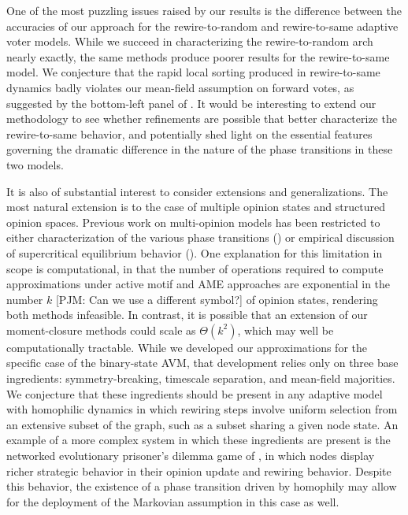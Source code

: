 \documentclass[review, onefignum, onetabnum]{siamart171218}
\newcommand{\pjm}[1]{{\color{blue}[PJM: #1]}}
\begin{document}
	One of the most puzzling issues raised by our results is the difference between the accuracies of our approach for the rewire-to-random and rewire-to-same adaptive voter models. 
	While we succeed in characterizing the rewire-to-random arch nearly exactly, the same methods produce poorer results for the rewire-to-same model. 
	We conjecture that the rapid local sorting produced in rewire-to-same dynamics badly violates our mean-field assumption on forward votes, as suggested by the bottom-left panel of . 
	It would be interesting to extend our methodology to see whether refinements are possible that better characterize the rewire-to-same behavior, and potentially shed light on the essential features governing the dramatic difference in the nature of the phase transitions in these two models. 
		
	It is also of substantial interest to consider extensions and generalizations. 
	The most natural extension is to the case of multiple opinion states and structured opinion spaces. 
	Previous work on multi-opinion models has been restricted to either characterization of the various phase transitions (\cite{Bohme2012}) or empirical discussion of supercritical equilibrium behavior (\cite{Shi2013}). 
	One explanation for this limitation in scope is computational, in that the number of operations required to compute approximations under active motif and AME approaches are exponential in the number $k$ \pjm{Can we use a different symbol?} of opinion states, rendering both methods infeasible. 
	In contrast, it is possible that an extension of our moment-closure methods could scale as $\Theta(k^2)$, which may well be computationally tractable. 
	While we developed our approximations for the specific case of the binary-state AVM, that development relies only on three base ingredients: symmetry-breaking, timescale separation, and mean-field majorities. 
	We conjecture that these ingredients should be present in any adaptive model with homophilic dynamics in which rewiring steps involve uniform selection from an extensive subset of the graph, such as a subset sharing a given node state. 
	An example of a more complex system in which these ingredients are present is the networked evolutionary prisoner's dilemma game of \cite{Lee2017a}, in which nodes display richer strategic behavior in their opinion update and rewiring behavior. 
	Despite this behavior, the existence of a phase transition driven by homophily may allow for the deployment of the Markovian assumption in this case as well. 
\end{document}
